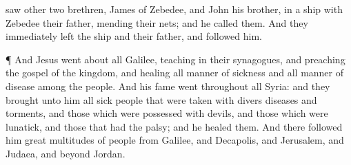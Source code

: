 {saw
other
two
brethren,
James
{} of
Zebedee,
and
John
his
brother,
in a
ship
with
Zebedee
their
father,
mending
their
nets;
and he
called
them.
And they
immediately
left the
ship
and
their
father, and
followed
him.
\par }{\PP {}¶
And
Jesus went
about
all
Galilee,
teaching
in
their
synagogues,
and
preaching the
gospel of the
kingdom,
and
healing all manner
of
sickness
and all manner
of
disease
among the
people.
And
his
fame
went
throughout
all
Syria:
and they
brought unto
him
all sick
people that were
taken with
divers
diseases
and
torments,
and those which were possessed with
devils,
and those which were
lunatick,
and those that had the
palsy;
and he
healed
them.
And there
followed
him great
multitudes of
people
from
Galilee,
and
{}
Decapolis,
and
{}
Jerusalem,
and
{}
Judaea,
and
{}
beyond
Jordan.

}

